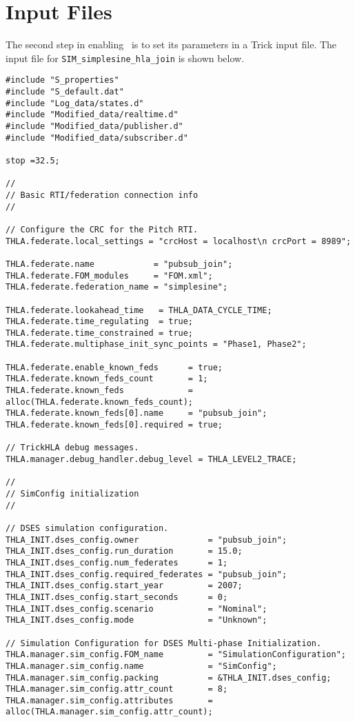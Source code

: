 \section{Input Files}

The second step in enabling \TrickHLA\ is to set its parameters in
a Trick input file.
The input file for {\tt SIM\_simplesine\_hla\_join} is shown below.

\begin{lstlisting}[caption={{\tt SIM\_simplesine\_hla\_join} input file},label={list:SIM-simplesine-hla-join-input}]
#include "S_properties"
#include "S_default.dat"
#include "Log_data/states.d"
#include "Modified_data/realtime.d"
#include "Modified_data/publisher.d"
#include "Modified_data/subscriber.d"

stop =32.5;

//
// Basic RTI/federation connection info
//

// Configure the CRC for the Pitch RTI.
THLA.federate.local_settings = "crcHost = localhost\n crcPort = 8989";

THLA.federate.name            = "pubsub_join";
THLA.federate.FOM_modules     = "FOM.xml";
THLA.federate.federation_name = "simplesine";

THLA.federate.lookahead_time   = THLA_DATA_CYCLE_TIME;
THLA.federate.time_regulating  = true;
THLA.federate.time_constrained = true;
THLA.federate.multiphase_init_sync_points = "Phase1, Phase2";

THLA.federate.enable_known_feds      = true;
THLA.federate.known_feds_count       = 1;
THLA.federate.known_feds             = alloc(THLA.federate.known_feds_count);
THLA.federate.known_feds[0].name     = "pubsub_join";
THLA.federate.known_feds[0].required = true;

// TrickHLA debug messages.
THLA.manager.debug_handler.debug_level = THLA_LEVEL2_TRACE;

//
// SimConfig initialization
//

// DSES simulation configuration.
THLA_INIT.dses_config.owner              = "pubsub_join";
THLA_INIT.dses_config.run_duration       = 15.0;
THLA_INIT.dses_config.num_federates      = 1;
THLA_INIT.dses_config.required_federates = "pubsub_join";
THLA_INIT.dses_config.start_year         = 2007;
THLA_INIT.dses_config.start_seconds      = 0;
THLA_INIT.dses_config.scenario           = "Nominal";
THLA_INIT.dses_config.mode               = "Unknown";

// Simulation Configuration for DSES Multi-phase Initialization.
THLA.manager.sim_config.FOM_name         = "SimulationConfiguration";
THLA.manager.sim_config.name             = "SimConfig";
THLA.manager.sim_config.packing          = &THLA_INIT.dses_config;
THLA.manager.sim_config.attr_count       = 8;
THLA.manager.sim_config.attributes       = alloc(THLA.manager.sim_config.attr_count);


\end{lstlisting}
